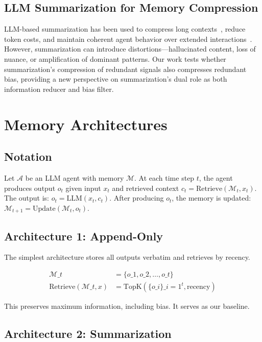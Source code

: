 \documentclass[11pt]{article}
\begin{document}
\subsection{LLM Summarization for Memory Compression}

LLM-based summarization has been used to compress long contexts~\cite{liu2023lost}, reduce token costs, and maintain coherent agent behavior over extended interactions~\cite{wu2024memochat}. However, summarization can introduce distortions---hallucinated content, loss of nuance, or amplification of dominant patterns. Our work tests whether summarization's compression of redundant signals also compresses redundant bias, providing a new perspective on summarization's dual role as both information reducer and bias filter.


\section{Memory Architectures}

\subsection{Notation}

Let $\mathcal{A}$ be an LLM agent with memory $\mathcal{M}$. At each time step $t$, the agent produces output $o_t$ given input $x_t$ and retrieved context $c_t = \text{Retrieve}(\mathcal{M}_t, x_t)$. The output is: $o_t = \text{LLM}(x_t, c_t)$. After producing $o_t$, the memory is updated: $\mathcal{M}_{t+1} = \text{Update}(\mathcal{M}_t, o_t)$.

\subsection{Architecture 1: Append-Only}

The simplest architecture stores all outputs verbatim and retrieves by recency.

\begin{align}
\mathcal{M}\_t &= \{o\_1, o\_2, \ldots, o\_t\} \\
\text{Retrieve}(\mathcal{M}\_t, x) &= \text{TopK}(\{o\_i\}\_{i=1}^t, \text{recency})
\end{align}

This preserves maximum information, including bias. It serves as our baseline.

\subsection{Architecture 2: Summarization}
\end{document}
